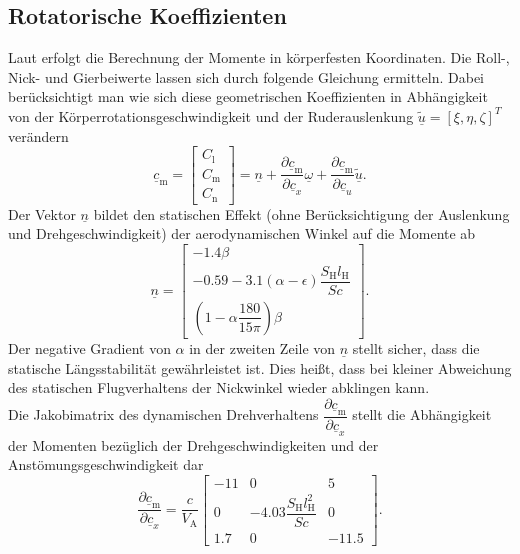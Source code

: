 \subsection{Rotatorische Koeffizienten}
Laut \cite{RAMYoutube_Playlist,RAMPaper} erfolgt die Berechnung der Momente in körperfesten Koordinaten. Die Roll-, Nick- und Gierbeiwerte lassen sich durch folgende Gleichung ermitteln. Dabei berücksichtigt man wie sich diese geometrischen Koeffizienten in Abhängigkeit von der Körperrotationsgeschwindigkeit und der Ruderauslenkung $\tilde{\underline{u}} = [\xi,\eta,
\zeta]^T$ verändern
\begin{equation}
\underline{c}_\mathrm{m}  = \begin{bmatrix} 
C_\mathrm{l}\\
C_\mathrm{m}\\
C_\mathrm{n}
\end{bmatrix}=\underline{n} + \dfrac{\partial  \underline{c}_\mathrm{m}}{\partial  \underline{c}_x} \underline{\omega} + \dfrac{\partial  \underline{c}_\mathrm{m}}{\partial  \underline{c}_u} \tilde{\underline{u}}.
\end{equation}
Der Vektor $\underline{n}$ bildet den statischen Effekt (ohne Berücksichtigung der Auslenkung und Drehgeschwindigkeit) der aerodynamischen Winkel auf die Momente ab 
\begin{equation}
\underline{n} = \begin{bmatrix} 
-1.4\beta \\
-0.59 -3.1(\alpha-\epsilon)\dfrac{S_\mathrm{H}l_\mathrm{H}}{Sc} \\
(1 - \alpha\dfrac{180}{15\pi})\beta
\end{bmatrix}.
\end{equation}
Der negative Gradient von $\alpha$ in der zweiten Zeile von $\underline{n}$ stellt sicher, dass die statische Längsstabilität gewährleistet ist. Dies hei{\ss}t, dass bei kleiner Abweichung des statischen Flugverhaltens der Nickwinkel wieder abklingen kann.\\
Die Jakobimatrix des dynamischen Drehverhaltens $\dfrac{\partial  \underline{c}_\mathrm{m}}{\partial  \underline{c}_x}$ stellt die Abhängigkeit der Momenten bezüglich der Drehgeschwindigkeiten und der Anstömungsgeschwindigkeit dar
\begin{equation}
\dfrac{\partial  \underline{c}_\mathrm{m}}{\partial  \underline{c}_x} = \dfrac{c}{V_\mathrm{A}}\begin{bmatrix} 
-11 & 0 & 5 \\
0 &-4.03\dfrac{S_\mathrm{H}l_\mathrm{H}^2}{Sc}&0 \\
1.7 & 0 & -11.5
\end{bmatrix}.
\end{equation}
